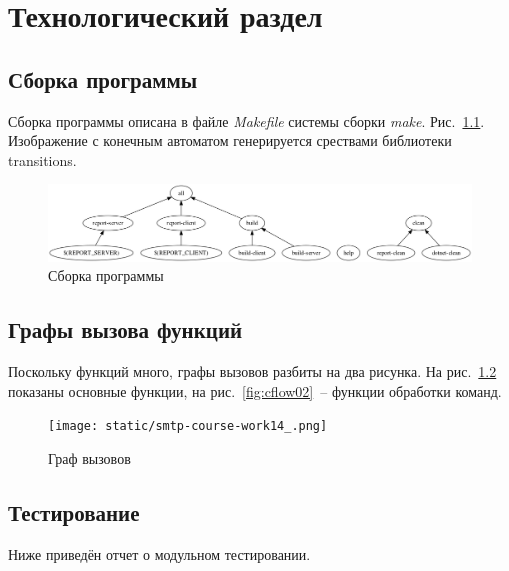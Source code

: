 \documentclass[a4paper,12pt]{report}
\begin{document}
\chapter{Технологический раздел}

\section{Сборка программы}

Сборка программы описана в файле \textit{Makefile} системы сборки \textit{make}. Рис.~\ref{fig:make}. Изображение с конечным автоматом генерируется срествами библиотеки transitions.

\begin{figure}
\centering
\includegraphics[width=\textwidth]{include/make.png}
\caption{Сборка программы}
\label{fig:make}
\end{figure}

\section{Графы вызова функций}

Поскольку функций много, графы вызовов разбиты на два рисунка. На рис.~\ref{fig:cflow01} показаны основные функции, на рис.~\ref{fig:cflow02}~-- функции обработки команд. 

\begin{figure}
\centering
\texttt{[image: static/smtp-course-work14\_.png]}
\caption{Граф вызовов}
\label{fig:cflow01}
\end{figure}

\vspace{100mm}

\section{Тестирование}

Ниже приведён отчет о модульном тестировании.
\end{document}
